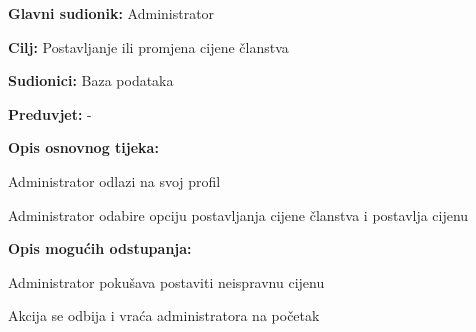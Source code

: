 				\noindent {}
				\begin{packed_item}
					
					\item \textbf{Glavni sudionik: }Administrator
					\item  \textbf{Cilj:} Postavljanje ili promjena cijene članstva
					\item  \textbf{Sudionici:} Baza podataka
					\item  \textbf{Preduvjet:} -
					\item  \textbf{Opis osnovnog tijeka:}
					
					\item[] \begin{packed_enum}
						
						\item Administrator odlazi na svoj profil
						\item Administrator odabire opciju postavljanja cijene članstva i postavlja cijenu
						
					\end{packed_enum}
					
					\item  \textbf{Opis mogućih odstupanja:}
					
					\item[] \begin{packed_item}
						
						\item[2.a] Administrator pokušava postaviti neispravnu cijenu
						\item[] \begin{packed_enum}
							
							\item Akcija se odbija i vraća administratora na početak							
						\end{packed_enum}
						
					\end{packed_item}
					
				\end{packed_item}
				
